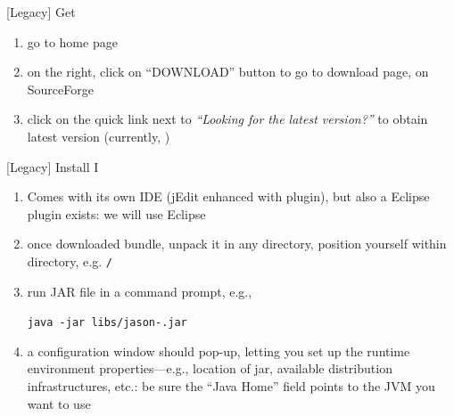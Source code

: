 \documentclass[presentation]{beamer}\mode<presentation>{\usetheme{AMSBolognaFC}}
\begin{document}
\begin{frame}[c]{[Legacy] Get \jason{}}
    \begin{enumerate}
        \item go to \jason{} home page
        \begin{center}
        \end{center}
    
        \vfill
    
        \item on the right, click on ``DOWNLOAD'' button to go to \jason{} download page, on SourceForge
        \begin{center}
        \end{center}
        
        \vfill
        
        \item click on the quick link next to \emph{``Looking for the latest version?''} to obtain \jason{} latest version (currently, \textbf{\jasonversion})
    \end{enumerate}
\end{frame}

\begin{frame}[c]{[Legacy] Install \jason{} I}
    \begin{enumerate}
        \item \jason{} Comes with its own IDE (jEdit enhanced with \jason{} plugin), but also a Eclipse plugin exists: we will use Eclipse
        
        \vfill
        
        \item once downloaded \jason{} bundle, unpack it in any directory, position yourself within \jason{} directory, e.g. \texttt{\jasonversion/}
        
        \vfill
        
        \item run \jason{} JAR file in a command prompt, e.g., 
        \begin{center}
            \alert{\texttt{java -jar libs/jason-\jasonversion.jar}}
        \end{center}
        
        \vfill
        
        \item a configuration window should pop-up, letting you set up the \jason{} runtime environment properties---e.g., location of \jason{} jar, available distribution infrastructures, etc.: be sure the ``Java Home'' field points to the JVM you want to use
        
    \end{enumerate}
        
\end{frame}
\end{document}
